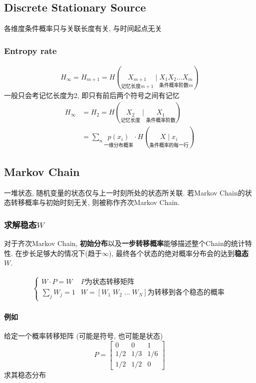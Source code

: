 \documentclass[a4paper]{report}
\begin{document}
\subsection{Discrete Stationary Source}
各维度条件概率只与关联长度有关, 与时间起点无关
\subsubsection{Entropy rate}
\begin{align*}
  H_\infty =H_{m+1}=H(\underset{\text{记忆长度}m+1}{X_{m+1}} \mid \underset{\text{条件概率阶数}m}{X_1X_2\dots X_m} )
\end{align*}
一般只会考记忆长度为2, 即只有前后两个符号之间有记忆
\begin{align*}
  H_\infty &=H_{2}=H(\underset{\text{记忆长度}}{X_{2}} \mid \underset{\text{条件概率阶数}}{X_1} )
  \\ &=\displaystyle\sum_{n}\underset{\text{一维分布概率}}{p(x_i)} \cdot H(\underset{\text{条件概率的每一行}}{X\mid x_i})
\end{align*}

\subsection{Markov Chain}
一堆状态, 随机变量的状态仅与上一时刻所处的状态所关联. 若Markov Chain的状态转移概率与初始时刻无关, 
则被称作齐次Markov Chain.

\subsubsection{求解稳态$W$}
对于齐次Markov Chain, \textbf{初始分布}以及\textbf{一步转移概率}能够描述整个Chain的统计特性. 
在步长足够大的情况下(趋于$\infty$), 最终各个状态的绝对概率分布会的达到\textbf{稳态} $W$. 

\begin{align*}
  \begin{cases}
    W\cdot P=W &\text{$P$为状态转移矩阵}\\ 
    \displaystyle\sum_{j} W_j=1 &W=[W_1 \; W_2 \; \dots \; W_N]\text{为转移到各个稳态的概率}
  \end{cases}
\end{align*}

\paragraph{例如}给定一个概率转移矩阵 (可能是符号, 也可能是状态)
\[
  P=
  \begin{bmatrix}
    0&0&1\\
    1/2&1/3&1/6\\
    1/2&1/2&0
  \end{bmatrix}
  \]求其稳态分布
\end{document}
